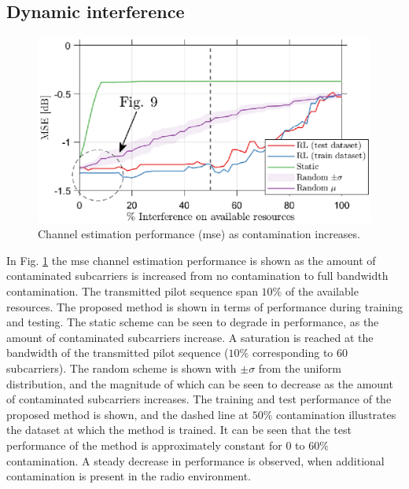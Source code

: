 \subsection{Dynamic interference}\label{subsec:RL_results_B}
\begin{figure}
    \centering
    \includegraphics{chapters/part_uplink/figures/results/MSE_Interference.eps}
    \caption{Channel estimation performance (\gls{mse}) as contamination increases.}
    \label{fig:RL_MSE_Interference}
\end{figure}
In Fig. \ref{fig:RL_MSE_Interference} the \gls{mse} channel estimation performance is shown as the amount of contaminated subcarriers is increased from no contamination to full bandwidth contamination. The transmitted pilot sequence span $10\%$ of the available resources. The proposed method is shown in terms of performance during training and testing. The static scheme can be seen to degrade in performance, as the amount of contaminated subcarriers increase. A saturation is reached at the bandwidth of the transmitted pilot sequence ($10\%$ corresponding to $60$ subcarriers). The random scheme is shown with $\pm \sigma$ from the uniform distribution, and the magnitude of which can be seen to decrease as the amount of contaminated subcarriers increases. The training and test performance of the proposed method is shown, and the dashed line at $50\%$ contamination illustrates the dataset at which the method is trained. It can be seen that the test performance of the method is approximately constant for $0$ to $60\%$ contamination. A steady decrease in performance is observed, when additional contamination is present in the radio environment. 

